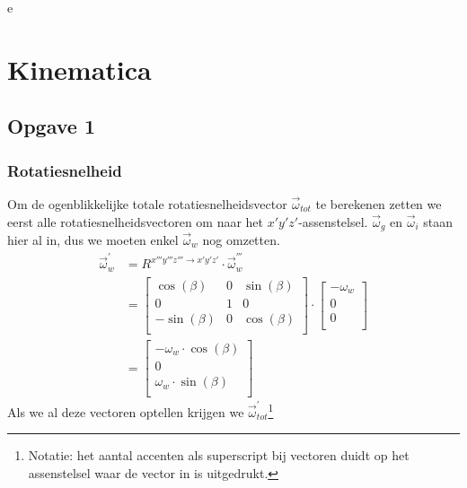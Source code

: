 e\section{Kinematica}
\subsection{Opgave 1}
\subsubsection{Rotatiesnelheid}
Om de ogenblikkelijke totale rotatiesnelheidsvector $\vec{\omega}_{tot}$ te berekenen zetten we eerst alle rotatiesnelheidsvectoren om naar het $x'y'z'$-assenstelsel. $\vec{\omega}_{g}$ en $\vec{\omega}_{i}$ staan hier al in, dus we moeten enkel $\vec{\omega}_{w}$ nog omzetten. 
\begin{equation}
\begin{split}
\vec{\omega}_{w}^{'}&=R^{x'''y'''z''' \rightarrow x'y'z'} \cdot \vec{\omega}_{w}^{'''}\\
&=\begin{bmatrix}
\cos(\beta)	&			0			&\sin(\beta)\\
0						&			1			&			0		 \\
-\sin(\beta)&			0			&\cos(\beta)\\
\end{bmatrix}
\cdot
\begin{bmatrix}
-\omega_{w}	\\
0						\\
0						\\
\end{bmatrix}\\
&=
\begin{bmatrix}
-\omega_{w}\cdot \cos(\beta)	\\
0						\\
\omega_{w}\cdot \sin(\beta)	\\
\end{bmatrix}
\end{split}
\label{eq:kin1.1}
\end{equation}
Als we al deze vectoren optellen krijgen we $\vec{\omega}_{tot}^{'}$\footnote{Notatie: het aantal accenten als superscript bij vectoren duidt op het assenstelsel waar de vector in is uitgedrukt.}
